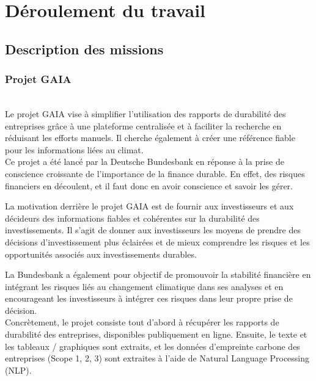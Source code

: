 \section{Déroulement du travail}


\subsection{Description des missions}

\subsubsection{Projet GAIA}
~\\

Le projet GAIA vise à simplifier l'utilisation des rapports de durabilité des entreprises grâce à une plateforme centralisée et à faciliter la recherche en réduisant les efforts manuels. 
Il cherche également à créer une référence fiable pour les informations liées au climat.
\\

Ce projet a été lancé par la Deutsche Bundesbank en réponse à la prise de conscience croissante de l'importance de la finance durable.
En effet, des risques financiers en découlent, et il faut donc en avoir conscience et savoir les gérer.

La motivation derrière le projet GAIA est de fournir aux investisseurs et aux décideurs des informations fiables et cohérentes sur la durabilité des investissements. 
Il s'agit de donner aux investisseurs les moyens de prendre des décisions d'investissement plus éclairées et de mieux comprendre les risques et les opportunités associés aux investissements durables.

La Bundesbank a également pour objectif de promouvoir la stabilité financière en intégrant les risques liés au changement climatique dans ses analyses et en encourageant les investisseurs à intégrer ces risques dans leur propre prise de décision.
\\
Concrètement, le projet consiste tout d'abord à récupérer les rapports de durabilité des entreprises, disponibles publiquement en ligne.
Ensuite, le texte et les tableaux / graphiques sont extraits, et les données d'empreinte carbone des entreprises (Scope 1, 2, 3) sont extraites à l'aide de Natural Language Processing (NLP).

